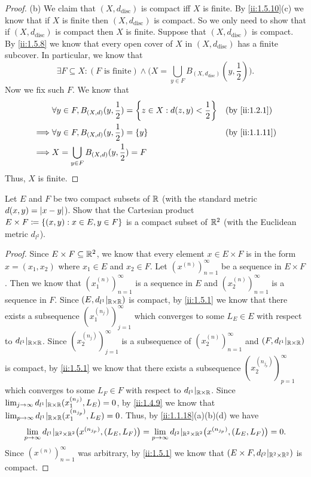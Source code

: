 \begin{proof}{(b)}
  We claim that \((X, d_{\text{disc}})\) is compact iff \(X\) is finite.
  By \cref{ii:1.5.10}(c) we know that if \(X\) is finite then \((X, d_{\text{disc}})\) is compact.
  So we only need to show that if \((X, d_{\text{disc}})\) is compact then \(X\) is finite.
  Suppose that \((X, d_{\text{disc}})\) is compact.
  By \cref{ii:1.5.8} we know that every open cover of \(X\) in \((X, d_{\text{disc}})\) has a finite subcover.
  In particular, we know that
  \[
    \exists F \subseteq X : (F \text{ is finite}) \land \bigg(X = \bigcup_{y \in F} B_{(X, d_{\text{disc}})}(y, \dfrac{1}{2})\bigg).
  \]
  Now we fix such \(F\).
  We know that
  \begin{align*}
             & \forall y \in F, B_{(X, d)}(y, \dfrac{1}{2}) = \set{z \in X : d(z, y) < \dfrac{1}{2}} &  & \by{ii:1.2.1}  \\
    \implies & \forall y \in F, B_{(X, d)}(y, \dfrac{1}{2}) = \set{y}                                &  & \by{ii:1.1.11} \\
    \implies & X = \bigcup_{y \in F} B_{(X, d)}(y, \dfrac{1}{2}) = F
  \end{align*}
  Thus, \(X\) is finite.
\end{proof}

\begin{ex}\label{ii:ex:1.5.13}
  Let \(E\) and \(F\) be two compact subsets of \(\mathbb{R}\) (with the standard metric \(d(x, y) = \left\lvert x - y\right\rvert\)).
  Show that the Cartesian product \(E \times F \coloneqq \left\lbrace(x, y) : x \in E, y \in F\right\rbrace\) is a compact subset of \(\mathbb{R}^2\) (with the Euclidean metric \(d_{l^2}\)).
\end{ex}

\begin{proof}
  Since \(E \times F \subseteq \mathbb{R}^2\), we know that every element \(x \in E \times F\) is in the form \(x = (x_1, x_2)\) where \(x_1 \in E\) and \(x_2 \in F\).
  Let \((x^{(n)})_{n = 1}^\infty\) be a sequence in \(E \times F\).
  Then we know that \((x_1^{(n)})_{n = 1}^\infty\) is a sequence in \(E\) and \((x_2^{(n)})_{n = 1}^\infty\) is a sequence in \(F\).
  Since \((E, d_{l^1}|_{\mathbb{R} \times \mathbb{R}})\) is compact, by \cref{ii:1.5.1} we know that there exists a subsequence \((x_1^{(n_j)})_{j = 1}^\infty\) which converges to some \(L_E \in E\) with respect to \(d_{l^1}|_{\mathbb{R} \times \mathbb{R}}\).
  Since \((x_2^{(n_j)})_{j = 1}^\infty\) is a subsequence of \((x_2^{(n)})_{n = 1}^\infty\) and \((F, d_{l^1}|_{\mathbb{R} \times \mathbb{R}})\) is compact, by \cref{ii:1.5.1} we know that there exists a subsequence \((x_2^{(n_{j_p})})_{p = 1}^\infty\) which converges to some \(L_F \in F\) with respect to \(d_{l^1}|_{\mathbb{R} \times \mathbb{R}}\).
  Since \(\lim_{j \to \infty} d_{l^1}|_{\mathbb{R} \times \mathbb{R}}(x_1^{(n_j)}, L_E) = 0\), by \cref{ii:1.4.9} we know that \(\lim_{p \to \infty} d_{l^1}|_{\mathbb{R} \times \mathbb{R}}(x_1^{(n_{j_p})}, L_E) = 0\).
  Thus, by \cref{ii:1.1.18}(a)(b)(d) we have
  \[
    \lim_{p \to \infty} d_{l^1}|_{\mathbb{R}^2 \times \mathbb{R}^2}\big(x^{(n_{j_p})}, (L_E, L_F)\big) = \lim_{p \to \infty} d_{l^2}|_{\mathbb{R}^2 \times \mathbb{R}^2}\big(x^{(n_{j_p})}, (L_E, L_F)\big) = 0.
  \]
  Since \((x^{(n)})_{n = 1}^\infty\) was arbitrary, by \cref{ii:1.5.1} we know that \((E \times F, d_{l^2}|_{\mathbb{R}^2 \times \mathbb{R}^2})\) is compact.
\end{proof}


